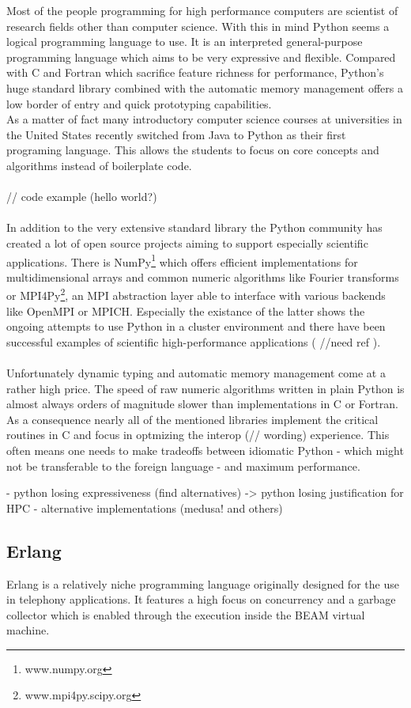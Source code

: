 Most of the people programming for high performance computers are scientist of research fields other than computer science. With this in mind Python seems a logical programming language to use. It is an interpreted general-purpose programming language which aims to be very expressive and flexible. Compared with C and Fortran which sacrifice feature richness for performance, Python's huge standard library combined with the automatic memory management offers a low border of entry and quick prototyping capabilities. \\
As a matter of fact many introductory computer science courses at universities in the United States recently switched from Java to Python as their first programing language. \cite{GUO14} This allows the students to focus on core concepts and algorithms instead of boilerplate code.
\\ \\
// code example (hello world?)
\\ \\
In addition to the very extensive standard library the Python community has created a lot of open source projects aiming to support especially scientific applications. There is NumPy\footnote{www.numpy.org} which offers efficient implementations for multidimensional arrays and common numeric algorithms like Fourier transforms or MPI4Py\footnote{www.mpi4py.scipy.org}, an MPI abstraction layer able to interface with various backends like OpenMPI or MPICH. Especially the existance of the latter shows the ongoing attempts to use Python in a cluster environment and there have been successful examples of scientific high-performance applications ( //need ref ).
\\ \\
Unfortunately dynamic typing and automatic memory management come at a rather high price. The speed of raw numeric algorithms written in plain Python is almost always orders of magnitude slower than implementations in C or Fortran. As a consequence nearly all of the mentioned libraries implement the critical routines in C and focus in optmizing the interop (// wording) experience. This often means one needs to make tradeoffs between idiomatic Python - which might not be transferable to the foreign language - and maximum performance.

- python losing expressiveness (find alternatives) -> python losing justification for HPC
- alternative implementations (medusa! and others)

\subsection*{Erlang}
\label{ssec:Candidates.Erlang}
Erlang is a relatively niche programming language originally designed for the use in telephony applications. It features a high focus on concurrency and a garbage collector which is enabled through the execution inside the BEAM virtual machine.

